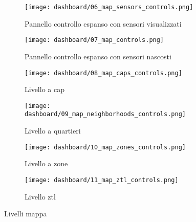 \begin{figure}[H]
  \centering

  \begin{subfigure}{0.48\textwidth}
    \centering
    \texttt{[image: dashboard/06\_map\_sensors\_controls.png]}
    \caption{Pannello controllo espanso con sensori visualizzati}
    \label{fig:map-layer-sensors}
  \end{subfigure}
  \hfill
  \begin{subfigure}{0.48\textwidth}
    \centering
    \texttt{[image: dashboard/07\_map\_controls.png]}
    \caption{Pannello controllo espanso con sensori nascosti}
    \label{fig:map-layer-clear}
  \end{subfigure}

  \vspace{1em}

  \begin{subfigure}{0.48\textwidth}
    \centering
    \texttt{[image: dashboard/08\_map\_caps\_controls.png]}
    \caption{Livello a \acrshort{cap}}
    \label{fig:map-layer-caps}
  \end{subfigure}
  \hfill
  \begin{subfigure}{0.48\textwidth}
    \centering
    \texttt{[image: dashboard/09\_map\_neighborhoods\_controls.png]}
    \caption{Livello a quartieri}
    \label{fig:map-layer-neighborhoods}
  \end{subfigure}

  \vspace{1em}

  \begin{subfigure}{0.48\textwidth}
    \centering
    \texttt{[image: dashboard/10\_map\_zones\_controls.png]}
    \caption{Livello a zone}
    \label{fig:map-layer-zones}
  \end{subfigure}
  \hfill
  \begin{subfigure}{0.48\textwidth}
    \centering
    \texttt{[image: dashboard/11\_map\_ztl\_controls.png]}
    \caption{Livello \acrshort{ztl}}
    \label{fig:map-layer-ztl}
  \end{subfigure}


  \caption{Livelli mappa}
  \label{fig:app-map-levels}
\end{figure}

\newpage

